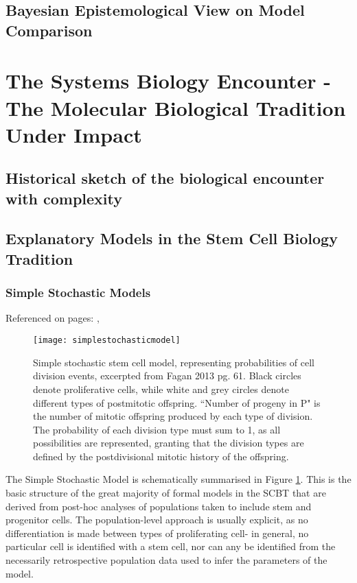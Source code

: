\subsection{Bayesian Epistemological View on Model Comparison}








\section{The Systems Biology Encounter - The Molecular Biological Tradition Under Impact}
\label{SBE}


\subsection{Historical sketch of the biological encounter with complexity}
\subsection{Explanatory Models in the Stem Cell Biology Tradition}
\subsubsection{Simple Stochastic Models}
\label{SSM}

Referenced on pages: \pageref{Harrisintro},\pageref{TMSmodel}

\begin{figure}
\texttt{[image: simplestochasticmodel]}
\centering
\caption{Simple stochastic stem cell model, representing probabilities of cell division events, excerpted from Fagan 2013 pg. 61. Black circles denote proliferative cells, while white and grey circles denote different types of postmitotic offspring. ``Number of progeny in P" is the number of mitotic offspring produced by each type of division. The probability of each division type must sum to 1, as all possibilities are represented, granting that the division types are defined by the postdivisional mitotic history of the offspring.}
\label{fig:SSM}
\end{figure}

The Simple Stochastic Model is schematically summarised in Figure \ref{fig:SSM}. This is the basic structure of the great majority of formal models in the SCBT that are derived from post-hoc analyses of populations taken to include stem and progenitor cells. The population-level approach is usually explicit, as no differentiation is made between types of proliferating cell- in general, no particular cell is identified with a stem cell, nor can any be identified from the necessarily retrospective population data used to infer the parameters of the model. 

